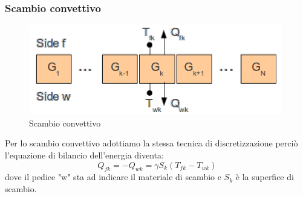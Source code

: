 \subsubsection{Scambio convettivo}
\begin{figure}[tbh]
\centering
\includegraphics{img/convettivo2.png}
\caption{Scambio convettivo}
\label{fig:convettivo2}
\end{figure}
Per lo scambio convettivo adottiamo la stessa tecnica di discretizzazione perciò l'equazione di bilancio dell'energia diventa:
$$Q_{fk}=-Q_{wk}= \gamma S_k(T_{fk}-T_{wk})$$
dove il pedice "w" sta ad indicare il materiale di scambio e $S_k$ è la superfice di scambio.

